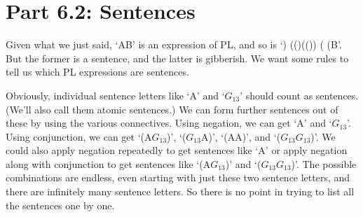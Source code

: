 \section{Part 6.2: Sentences}
Given what we just said, ‘A\eand B’ is an expression of PL, and so is ‘\enot) (\eor ()\eand (\enot\enot()) ( (B’. But the former is a sentence, and the latter is gibberish. We want some rules to tell us which PL expressions are sentences.

Obviously, individual sentence letters like ‘A’ and ‘$G_{13}$’ should count as sentences. (We’ll also call them atomic sentences.) We can form further sentences out of these by using the various connectives. Using negation, we can get ‘\enot A’ and ‘\enot $G_{13}$’. Using conjunction, we can get ‘(A\eand $G_{13}$)’, ‘($G_{13}$\eand A)’, ‘(A\eand A)’, and ‘($G_{13}$\eand $G_{13}$)’. We could also apply negation repeatedly to get sentences like ‘\enot\enot A’ or apply negation along with conjunction to get sentences like ‘\enot(A\eand $G_{13}$)’ and ‘\enot($G_{13}$\eand \enot $G_{13}$)’. The possible combinations are endless, even starting with just these two sentence letters, and there are infinitely many sentence letters. So there is no point in trying to list all the sentences one by one.

